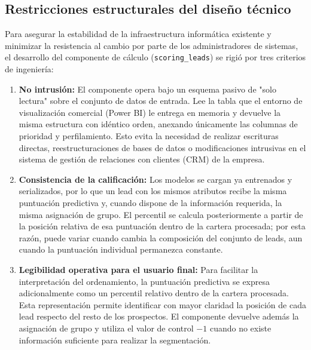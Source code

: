 \subsection{Restricciones estructurales del diseño técnico}
Para asegurar la estabilidad de la infraestructura informática existente y minimizar la resistencia al cambio por parte de los administradores de sistemas, el desarrollo del componente de cálculo (\texttt{scoring\_leads}) se rigió por tres criterios de ingeniería:
\begin{enumerate}
    \item \textbf{No intrusión:} El componente opera bajo un esquema pasivo de "solo lectura" sobre el conjunto de datos de entrada. Lee la tabla que el entorno de visualización comercial (Power BI) le entrega en memoria y devuelve la misma estructura con idéntico orden, anexando únicamente las columnas de prioridad y perfilamiento. Esto evita la necesidad de realizar escrituras directas, reestructuraciones de bases de datos o modificaciones intrusivas en el sistema de gestión de relaciones con clientes (CRM) de la empresa.
    \item \textbf{Consistencia de la calificación:} Los modelos se cargan ya entrenados y serializados, por lo que un lead con los mismos atributos recibe la misma puntuación predictiva y, cuando dispone de la información requerida, la misma asignación de grupo. El percentil se calcula posteriormente a partir de la posición relativa de esa puntuación dentro de la cartera procesada; por esta razón, puede variar cuando cambia la composición del conjunto de leads, aun cuando la puntuación individual permanezca constante.
    \item \textbf{Legibilidad operativa para el usuario final:} Para facilitar la interpretación del ordenamiento, la puntuación predictiva se expresa adicionalmente como un percentil relativo dentro de la cartera procesada. Esta representación permite identificar con mayor claridad la posición de cada lead respecto del resto de los prospectos. El componente devuelve además la asignación de grupo y utiliza el valor de control $-1$ cuando no existe información suficiente para realizar la segmentación.
\end{enumerate}


